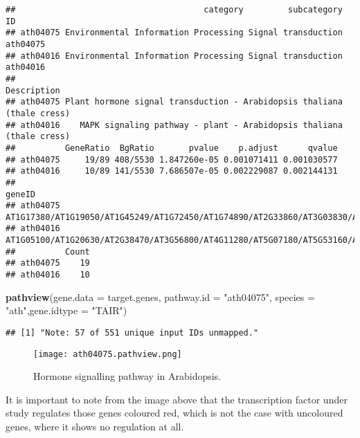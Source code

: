 \documentclass[
]{article}
\newenvironment{Shaded}{\begin{snugshade}}{\end{snugshade}}
\newcommand{\AttributeTok}[1]{\textcolor[rgb]{0.13,0.29,0.53}{#1}}
\newcommand{\FunctionTok}[1]{\textcolor[rgb]{0.13,0.29,0.53}{\textbf{#1}}}
\newcommand{\NormalTok}[1]{#1}
\newcommand{\StringTok}[1]{\textcolor[rgb]{0.31,0.60,0.02}{#1}}
\begin{document}
\begin{verbatim}
##                                      category         subcategory       ID
## ath04075 Environmental Information Processing Signal transduction ath04075
## ath04016 Environmental Information Processing Signal transduction ath04016
##                                                                     Description
## ath04075 Plant hormone signal transduction - Arabidopsis thaliana (thale cress)
## ath04016    MAPK signaling pathway - plant - Arabidopsis thaliana (thale cress)
##          GeneRatio  BgRatio       pvalue    p.adjust      qvalue
## ath04075     19/89 408/5530 1.847260e-05 0.001071411 0.001030577
## ath04016     10/89 141/5530 7.686507e-05 0.002229087 0.002144131
##                                                                                                                                                                                                 geneID
## ath04075 AT1G17380/AT1G19050/AT1G45249/AT1G72450/AT1G74890/AT2G33860/AT3G03830/AT3G26810/AT3G56800/AT3G63010/AT4G34160/AT4G38850/AT5G53160/AT5G66880/AT1G04250/AT1G10470/AT1G19350/AT2G01570/AT4G00880
## ath04016                                                                                           AT1G05100/AT1G20630/AT2G38470/AT3G56800/AT4G11280/AT5G07180/AT5G53160/AT5G62230/AT5G66880/AT5G47910
##          Count
## ath04075    19
## ath04016    10
\end{verbatim}

\begin{Shaded}
\begin{Highlighting}[]
\FunctionTok{pathview}\NormalTok{(}\AttributeTok{gene.data =}\NormalTok{ target.genes,}
         \AttributeTok{pathway.id =} \StringTok{"ath04075"}\NormalTok{,}
         \AttributeTok{species =} \StringTok{"ath"}\NormalTok{,}\AttributeTok{gene.idtype =} \StringTok{"TAIR"}\NormalTok{)}
\end{Highlighting}
\end{Shaded}

\begin{verbatim}
## [1] "Note: 57 of 551 unique input IDs unmapped."
\end{verbatim}

\begin{figure}
\centering
\texttt{[image: ath04075.pathview.png]}
\caption{Hormone signalling pathway in Arabidopsis.}
\end{figure}

It is important to note from the image above that the transcription
factor under study regulates those genes coloured red, which is not the
case with uncoloured genes, where it shows no regulation at all.
\end{document}
